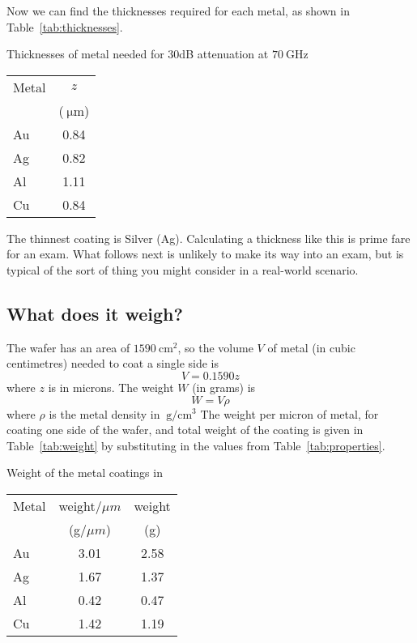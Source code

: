 \documentclass{tufte-handout}
\begin{document}
Now we can find the thicknesses required for each metal, as shown in Table~\ref{tab:thicknesses}.
\begin{margintable}
\caption{Thicknesses of metal needed for 30dB attenuation at $\SI{70}{\giga\hertz}$}
\centering
\begin{tabular}{|l|c|}
\hline 
Metal & $z$ \\
& ($\SI{}{\micro\metre}$)\\
\hline
Au & 0.84 \\
Ag & 0.82 \\
Al &  1.11 \\
Cu & 0.84 \\
\hline
\end{tabular}
\label{tab:thicknesses}
\end{margintable}
The thinnest coating is Silver (Ag).
Calculating a thickness like this is prime fare for an exam. What follows next is unlikely to make its way into an exam, but is typical of the sort of thing you might consider in a real-world scenario.

\subsection{What does it weigh?}

The wafer has an area of $\SI{1590}{\centi\metre\squared}$, so the volume $V$ of metal (in cubic centimetres) needed to coat a single side is
\begin{equation}
V = 0.1590z 
\end{equation}
where $z$ is in microns.  The weight $W$ (in grams) is 
\begin{equation}
W = V\rho
\end{equation}
where $\rho$ is the metal density in $\SI{}{\gram\per\centi\metre\cubed}$ 
The weight per micron of metal, for coating one side of the wafer, and total weight of the coating is given in Table~\ref{tab:weight} by substituting in the values from Table~\ref{tab:properties}.
\begin{margintable}
\caption{Weight of the metal coatings in }
\centering
\begin{tabular}{|l|c|c|}
\hline 
Metal & weight/$\mu m$ & weight\\
& (g/$\mu m$) & (g)\\
\hline
Au & 3.01 & 2.58  \\
Ag & 1.67 &  1.37 \\
Al &  0.42 & 0.47 \\
Cu & 1.42 & 1.19\\
\hline
\end{tabular}
\label{tab:weight}
\end{margintable}
\end{document}
